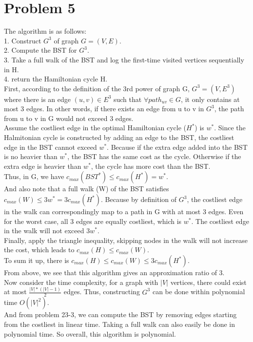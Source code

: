 \documentclass[titlepage, paper=a4, fontsize=11pt]{scrartcl} %
\numberwithin{equation}{section} %
\numberwithin{figure}{section} %
\numberwithin{table}{section} %
\begin{document}

\section*{Problem 5}
The algorithm is as follows: \\
1. Construct $G^3$ of graph $G = (V, E)$. \\
2. Compute the BST for $G^3$. \\
3. Take a full walk of the BST and log the first-time visited vertices sequentially in H. \\
4. return the Hamiltonian cycle H. \\

First, according to the definition of the 3rd power of graph G, $G^3 = (V, E^3)$ where there is an edge
$(u, v) \in E^3$ such that $\forall path_{uv} \in G$, it only contains at most 3 edges. In other words, if there exists an edge from u to v in $G^3$, the path from u to v in G would not exceed 3 edges. \\
Assume the costliest edge in the optimal Hamiltonian cycle ($H^*$) is $w^*$. Since the Halmitonian cycle is constructed by adding an edge to the BST, the costliest edge in the BST cannot exceed $w^*$. Because if the extra edge added into the BST is no heavier than $w^*$, the BST has the same cost as the cycle. Otherwise if the extra edge is heavier than $w^*$, the cycle has more cost than the BST. \\
Thus, in G, we have $c_{max}(BST^*) \leq c_{max}(H^*) = w^*$. \\
And also note that a full walk (W) of the BST satisfies $c_{max}(W) \leq 3w^* = 3c_{max}(H^*)$. Because by definition of $G^3$, the costliest edge in the walk can correspondingly map to a path in G with at most 3 edges. Even for the worst case, all 3 edges are equally costliest, which is $w^*$. The costliest edge in the walk will not exceed $3w^*$. \\
Finally, apply the triangle inequality, skipping nodes in the walk will not increase the cost, which leads to
$c_{max}(H) \leq c_{max}(W)$. \\
To sum it up, there is $c_{max}(H) \leq c_{max}(W) \leq 3c_{max}(H^*)$. \\
From above, we see that this algorithm gives an approximation ratio of 3. \\

Now consider the time complexity, for a graph with $|V|$ vertices, there could exist at most $\frac{|V|*(|V|-1)}{2}$ edges. Thus, constructing $G^3$ can be done within polynomial time $O(|V|^2)$. \\
And from problem 23-3, we can compute the BST by removing edges starting from the costliest in linear time. Taking a full walk can also easily be done in polynomial time. So overall, this algorithm is polynomial.
\end{document}
